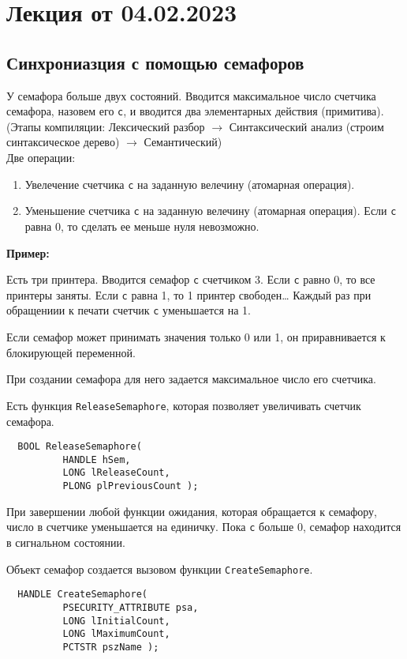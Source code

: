 
\section{Лекция от 04.02.2023}

\subsection{Синхрониазция с помощью семафоров}

У семафора больше двух состояний. Вводится максимальное число счетчика семафора,
назовем его \verb!c!, и вводится два элементарных действия (примитива).\\
{\ttfamily (Этапы компиляции: Лексический разбор $\to$ Синтаксический анализ
(строим синтаксическое дерево) $\to$ Семантический)}\\ 
Две операции:
\begin{enumerate}
  \item Увелечение счетчика \verb!c! на заданную велечину (атомарная операция).
  \item Уменьшение счетчика \verb!c! на заданную велечину (атомарная операция). Если
    \verb!c! равна 0, то сделать ее меньше нуля невозможно.
\end{enumerate}\par

\textbf{Пример:}\par
Есть три принтера. Вводится семафор \verb!c! счетчиком 3. Если \verb!c! равно 0, то все
принтеры заняты. Если \verb!c! равна 1, то 1 принтер свободен\dots 
Каждый раз при обращениии к печати счетчик \verb!c! уменьшается на 1. 

Если семафор может принимать значения только 0 или 1, он приравнивается к
блокирующей переменной.

При создании семафора для него задается максимальное число его счетчика. 

Есть функция \verb!ReleaseSemaphore!, которая позволяет увеличивать счетчик
семафора.
\begin{verbatim}
  BOOL ReleaseSemaphore(
          HANDLE hSem,
          LONG lReleaseCount,
          PLONG plPreviousCount );
\end{verbatim}

При завершении любой функции ожидания, которая обращается к семафору, число в
счетчике уменьшается на единичку. Пока \verb!c! больше 0, семафор находится в
сигнальном состоянии.

Объект семафор создается вызовом функции \verb!CreateSemaphore!.
\begin{verbatim}
  HANDLE CreateSemaphore(
          PSECURITY_ATTRIBUTE psa,
          LONG lInitialCount,
          LONG lMaximumCount,
          PCTSTR pszName );
\end{verbatim}

